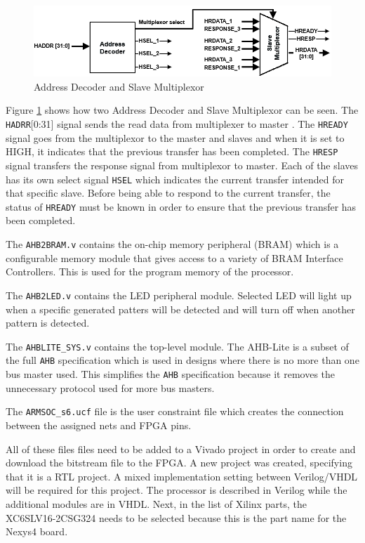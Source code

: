 \begin{figure}
\centering
\includegraphics[scale=0.7]{figures/decoder_and_multiplexer.PNG}
\caption{Address Decoder and Slave Multiplexor\cite{ahblite} } 
\label{fig:decoder_multiplexer}
\end{figure}

Figure \ref{fig:decoder_multiplexer} shows how two Address Decoder and Slave Multiplexor can be seen. The \verb|HADRR|[0:31] signal sends the read data from multiplexer to master \cite{ahblite}. The \verb|HREADY| signal goes from the multiplexor to the master and slaves and when it is set to HIGH, it indicates that the previous transfer has been completed. The \verb|HRESP| signal transfers the response signal from multiplexor to master. Each of the slaves has its own select signal \verb|HSEL| which indicates the current transfer intended for that specific slave. Before being able to respond to the current transfer, the status of \verb|HREADY| must be known in order to ensure that the previous transfer has been completed. 

The \verb|AHB2BRAM.v| contains the on-chip memory peripheral (BRAM) 
which is a configurable memory module that gives access to a variety of BRAM Interface Controllers. This is used for the program memory of the processor.

The \verb|AHB2LED.v| contains the LED peripheral module. Selected LED will light up when a specific generated patters will be detected and will turn off when another pattern is detected.

The \verb|AHBLITE_SYS.v| contains the top-level module. The AHB-Lite is a subset of the full \verb|AHB| specification which is used in designs where there is no more than one bus master used. This simplifies the \verb|AHB| specification because it removes the unnecessary protocol used for more bus masters.

The \verb|ARMSOC_s6.ucf| file is the user constraint file which creates the connection between the assigned nets and FPGA pins.

All of these files files need to be added to a Vivado project in order to create and download the bitstream file to the FPGA. A new project was created, specifying that it is a RTL project. A mixed implementation setting between Verilog/VHDL will be required for this project. The processor is described in Verilog while the additional modules are in VHDL. Next, in the list of Xilinx parts, the XC6SLV16-2CSG324 needs to be selected because this is the part name for the Nexys4 board. 

